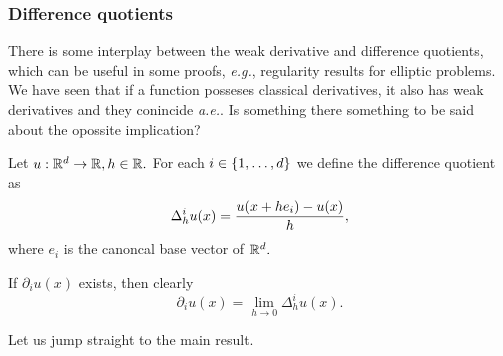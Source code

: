 \documentclass{article}
\begin{document}
\subsubsection{Difference quotients}
\label{sec:difference_quotients}

There is some interplay between the weak derivative and difference quotients, which can be useful in some proofs, \textit{e.g.}, regularity results for elliptic problems.
We have seen that if a function posseses classical derivatives, it also has weak derivatives and they conincide \textit{a.e.}. Is something there something to be said about the opossite implication?

\begin{definition}
    Let $u: {\mathbb R}^{d} \to {\mathbb R}, h \in {\mathbb R}.$ For each $i \in \qty{1, \dots, d}$ we define the difference quotient as
    \[
	    \Delta_{h}^i u(x) = \frac{u\qty(x+h e_i) - u(x)}{h},
    \]
    where $e_i$ is the canoncal base vector of ${\mathbb R}^{d}.$
\end{definition}

\begin{remark}
	If $\partial_{i}u(x)$ exists, then clearly
	\[
		\partial_{i}u(x) = \lim_{h\to 0}\Delta_h^i u(x).
	\]
\end{remark}

Let us jump straight to the main result.
\end{document}
